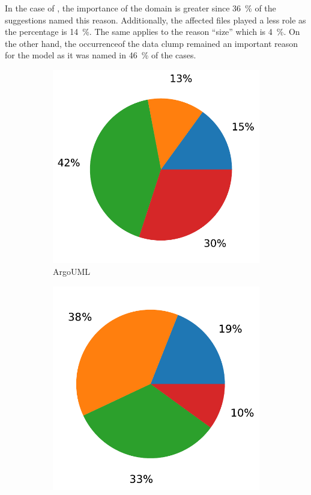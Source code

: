 In the case of \dolphinscheduler, the importance of the domain is greater since 36~\% of the suggestions named this reason. Additionally, the affected files played a less role as the percentage is 14~\%. The same applies to the reason \enquote{size} which is 4~\%. On the other hand, the occurrenceof the data clump remained an important reason for the model as it was named in 46~\% of the cases. 
\begin{figure}[ht!]
    \centering
    \begin{subfigure}[t]{0.44\columnwidth}
        \includegraphics[width=1\columnwidth]{figures/chapter5/filter_reason_argouml.pdf}
        \caption{ArgoUML}
        \label{fig:filter_reason_argouml}
    \end{subfigure}
            \begin{subfigure}[t]{0.44\columnwidth}
        \includegraphics[width=1\columnwidth]{figures/chapter5/filter_reason_type_rocketmq.pdf}

\end{subfigure}
\end{figure}
